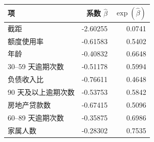 \begin{tabular}{lrr}
\toprule
项 & 系数 $\widehat\beta$ & $\exp(\widehat\beta)$ \\
\midrule
截距 & -2.60255 & 0.0741 \\
额度使用率 & -0.61583 & 0.5402 \\
年龄 & -0.40832 & 0.6648 \\
30–59 天逾期次数 & -0.51178 & 0.5994 \\
负债收入比 & -0.76611 & 0.4648 \\
90 天及以上逾期次数 & -0.53753 & 0.5842 \\
房地产贷款数 & -0.67415 & 0.5096 \\
60–89 天逾期次数 & -0.35875 & 0.6986 \\
家属人数 & -0.28302 & 0.7535 \\
\bottomrule
\end{tabular}
